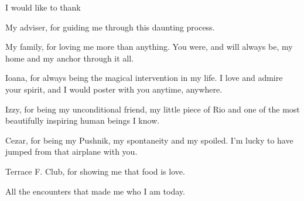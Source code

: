 I would like to thank 

My adviser, for guiding me through this daunting process. \par

My family, for loving me more than anything. You were, and will always be, my home and my anchor through it all. \par

Ioana, for always being the magical intervention in my life. I love and admire your spirit, and I would poster with you anytime, anywhere. \par

Izzy, for being my unconditional friend, my little piece of Rio and one of the most beautifully inspiring human beings I know. \par

Cezar, for being my Pushnik, my spontaneity and my spoiled. I'm lucky to have jumped from that airplane with you. \par

Terrace F. Club, for showing me that food is love.\par

All the encounters that made me who I am today.


